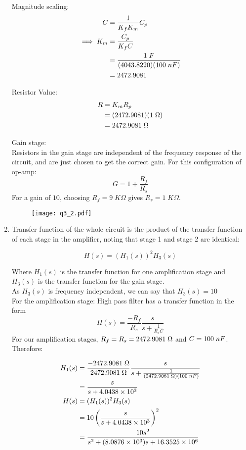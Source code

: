 \begin{enumerate}
{	Magnitude scaling:
	\begin{align*}
	C &= \frac{1}{K_f K_m} C_p
	\\
	\implies K_m &= \frac{C_p}{K_f C}
	\\
	&= \frac{1 \; F}{(4043.8220) (100 \; nF)}
	\\
	&= 2472.9081
	\end{align*}
	
	Resistor Value:
	\begin{align*}
	R &= K_m R_p
	\\
	&= (2472.9081)(1 \; \Omega)
	\\
	&= 2472.9081 \; \Omega
	\end{align*}
	
	Gain stage:\\
	Resistors in the gain stage are independent of the frequency response of the circuit, 
	and are just chosen to get the correct gain. For this configuration of op-amp:
	$$ G = 1 + \frac{R_f}{R_s} $$
	For a gain of $10$, choosing $R_f = 9 \; K\Omega$ gives $R_s = 1 \; K\Omega$. 
	
	\begin{figure}[H]
	\begin{center}
	\texttt{[image: q3\_2.pdf]}
	\end{center}
	\end{figure}
	
	}
	
	\item{
	Transfer function of the whole circuit is the product of the transfer function of
	each stage in the amplifier, noting that stage 1 and stage 2 are identical:
	
	$$ H(s) = (H_1(s))^2 H_3(s) $$
	
	Where $H_1(s)$ is the transfer function for one amplification stage and 
	$H_3(s)$ is the transfer function for the gain stage.\\
	As $H_3(s)$ is frequency independent, we can say that $H_3(s) = 10 $\\
	
	For the amplification stage:
	High pass filter has a transfer function in the form 
	$$H(s) = \frac{-R_f}{R_s}\frac{s}{s + \frac{1}{R_sC}}$$
	For our amplification stages, $R_f = R_s = 2472.9081 \; \Omega$ and $C = 100 \; nF$.
	Therefore:
	
	\begin{align*}
	H_1(s) &= \frac{- 2472.9081 \; \Omega}{2472.9081 \; \Omega} \frac{s}{s + \frac{1}{(2472.9081 \; \Omega)(100 \; nF)}}
	\\
	&= \frac{s}{s + 4.0438 \times 10^3 }
	\\
	H(s) &= (H_1(s))^2H_3(s)
	\\
	&= 10 \left( \frac{s}{s + 4.0438 \times 10^3 } \right)^2 
	\\
	&= \frac{10 s^2}{s^2 + (8.0876\times 10^3) s + 16.3525 \times 10^6}
	\end{align*}
	}
	

\end{enumerate}
